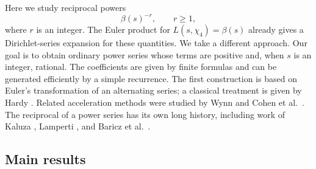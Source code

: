 \documentclass[11pt,reqno]{amsart}
\numberwithin{equation}{section}
\theoremstyle{definition}
\theoremstyle{remark}
\begin{document}
Here we study reciprocal powers
\[
 \beta(s)^{-r},\qquad r\geq1,
\]
where \(r\) is an integer.
The Euler product for \(L(s,\chi_4)=\beta(s)\) already gives a
Dirichlet-series expansion for these quantities.  We take a different
approach.  Our goal is to obtain ordinary power series whose terms are
positive and, when \(s\) is an integer, rational.  The coefficients are
given by finite formulas and can be generated efficiently by a simple
recurrence.
The first construction is based on Euler's transformation of an
alternating series; a classical treatment is given by Hardy
\cite[Ch.~VIII]{Hardy1949}.  Related acceleration methods were
studied by Wynn \cite{Wynn1971} and Cohen et al.~\cite{CohenRVZ2000}.
The reciprocal of a power series has its own long history, including
work of Kaluza \cite{Kaluza1928}, Lamperti \cite{Lamperti1958}, and
Baricz et al.~\cite{BariczVestiVuorinen2011}.

\subsection{Main results}
\end{document}
